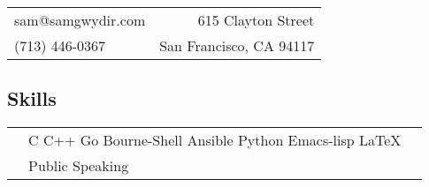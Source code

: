 \documentclass[resmargin,line,12pt]{res}
\begin{document}
\hfill
\vspace*{-.45in}
\begin{tabular}{l r}
sam@samgwydir.com & 615 Clayton Street\\
(713) 446-0367 & San Francisco, CA 94117
\end{tabular}

\vspace*{.1in}
{\color{Black}
\begin{resume}

\vspace*{.05in}
{\color{Black}
  \vspace{-.10in}
  \section{\sc Skills}}
\hspace{-.35in}
{\renewcommand{\arraystretch}{1.25}
  \renewcommand{\tabcolsep}{0.175cm}
  \begin{tabular}{l l l}
    & C C++ Go Bourne-Shell Ansible Python Emacs-lisp \LaTeX{} \\
    & Public Speaking & \\
  \end{tabular}}



\end{resume}}
\end{document}

